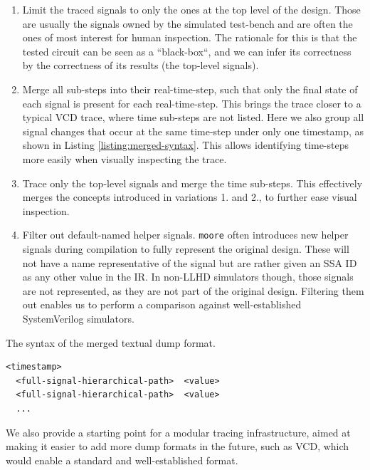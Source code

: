 \begin{enumerate}
    \item Limit the traced signals to only the ones at the top level of the design. Those are usually the signals owned by the simulated test-bench and are often the ones of most interest for human inspection. The rationale for this is that the tested circuit can be seen as a “black-box“, and we can infer its correctness by the correctness of its results (the top-level signals).
    \item Merge all sub-steps into their real-time-step, such that only the final state of each signal is present for each real-time-step. This brings the trace closer to a typical VCD trace, where time sub-steps are not listed. Here we also group all signal changes that occur at the same time-step under only one timestamp, as shown in Listing \ref{listing:merged-syntax}. This allows identifying time-steps more easily when visually inspecting the trace.
    \item Trace only the top-level signals and merge the time sub-steps. This effectively merges the concepts introduced in variations 1. and 2., to further ease visual inspection.
    \item Filter out default-named helper signals. \texttt{moore} often introduces new helper signals during compilation to fully represent the original design. These will not have a name representative of the signal but are rather given an SSA ID as any other value in the IR. In non-LLHD simulators though, those signals are not represented, as they are not part of the original design. Filtering them out enables us to perform a comparison against well-established SystemVerilog simulators.
\end{enumerate}

\begin{listing}
    \caption{The syntax of the merged textual dump format.}
    \label{listing:merged-syntax}
    \centering
    \begin{minipage}{0.6\textwidth}
        \begin{verbatim}
<timestamp>
  <full-signal-hierarchical-path>  <value>
  <full-signal-hierarchical-path>  <value>
  ...
            \end{verbatim}
    \end{minipage}
\end{listing}

We also provide a starting point for a modular tracing infrastructure, aimed at making it easier to add more dump formats in the future, such as VCD, which would enable a standard and well-established format.

